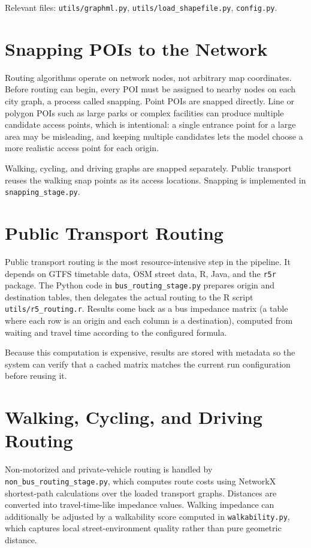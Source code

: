 \documentclass[11pt]{article}
\begin{document}
Relevant files: \texttt{utils/graphml.py}, \texttt{utils/load\_shapefile.py}, \texttt{config.py}.

\section{Snapping POIs to the Network}

Routing algorithms operate on network nodes, not arbitrary map coordinates. Before routing can begin, every POI must be assigned to nearby nodes on each city graph, a process called snapping. Point POIs are snapped directly. Line or polygon POIs such as large parks or complex facilities can produce multiple candidate access points, which is intentional: a single entrance point for a large area may be misleading, and keeping multiple candidates lets the model choose a more realistic access point for each origin.

Walking, cycling, and driving graphs are snapped separately. Public transport reuses the walking snap points as its access locations. Snapping is implemented in \texttt{snapping\_stage.py}.

\section{Public Transport Routing}

Public transport routing is the most resource-intensive step in the pipeline. It depends on GTFS timetable data, OSM street data, R, Java, and the \texttt{r5r} package. The Python code in \texttt{bus\_routing\_stage.py} prepares origin and destination tables, then delegates the actual routing to the R script \texttt{utils/r5\_routing.r}. Results come back as a bus impedance matrix (a table where each row is an origin and each column is a destination), computed from waiting and travel time according to the configured formula.

Because this computation is expensive, results are stored with metadata so the system can verify that a cached matrix matches the current run configuration before reusing it.

\section{Walking, Cycling, and Driving Routing}

Non-motorized and private-vehicle routing is handled by \texttt{non\_bus\_routing\_stage.py}, which computes route costs using NetworkX shortest-path calculations over the loaded transport graphs. Distances are converted into travel-time-like impedance values. Walking impedance can additionally be adjusted by a walkability score computed in \texttt{walkability.py}, which captures local street-environment quality rather than pure geometric distance.
\end{document}
